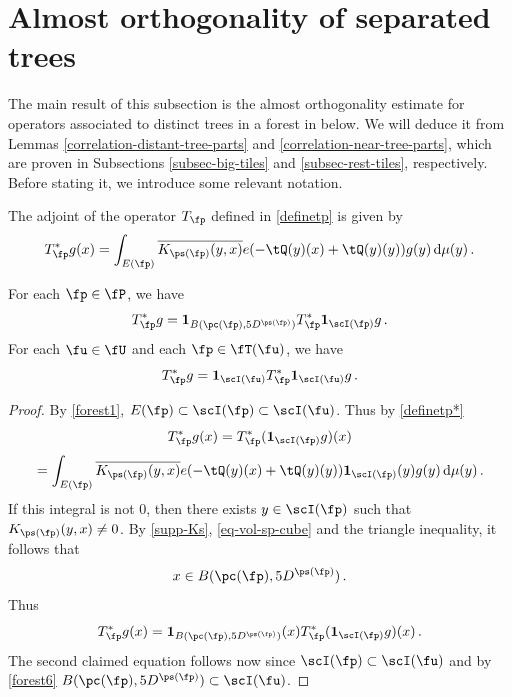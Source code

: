 \section{Almost orthogonality of separated trees}

The main result of this subsection is the almost orthogonality estimate for operators associated to distinct trees in a forest in  below. We will deduce it from Lemmas \ref{correlation-distant-tree-parts} and \ref{correlation-near-tree-parts}, which are proven in Subsections \ref{subsec-big-tiles} and \ref{subsec-rest-tiles}, respectively. Before stating it, we introduce some relevant notation.

The adjoint of the operator $T_{\fp}$ defined in \eqref{definetp} is given by
\begin{equation}
    \label{definetp*}
    T_{\fp}^* g(x) = \int_{E(\fp)} \overline{K_{\ps(\fp)}(y,x)} e(-\tQ(y)(x)+ \tQ(y)(y)) g(y) \, \mathrm{d}\mu(y)\,.
\end{equation}

\begin{lemma}
    \label{adjoint-tile-support}
    For each $\fp \in \fP$, we have
    $$
        T_{\fp}^* g = \mathbf{1}_{B(\pc(\fp), 5D^{\ps(\fp)})} T_{\fp}^* \mathbf{1}_{\scI(\fp)} g\,.
    $$
    For each $\fu \in \fU$ and each $\fp \in \fT(\fu)$, we have
    $$
        T_{\fp}^* g = \mathbf{1}_{\scI(\fu)} T_{\fp}^* \mathbf{1}_{\scI(\fu)} g\,.
    $$
\end{lemma}

\begin{proof}
    By \eqref{forest1}, $E(\fp) \subset \scI(\fp) \subset \scI(\fu)$. Thus by \eqref{definetp*}
    $$
         T_{\fp}^* g(x) = T_{\fp}^* (\mathbf{1}_{\scI(\fp)} g)(x)
    $$
    $$
        = \int_{E(\fp)} \overline{K_{\ps(\fp)}(y,x)} e(-\tQ(y)(x) + \tQ(y)(y)) \mathbf{1}_{\scI(\fp)}(y) g(y) \, \mathrm{d}\mu(y)\,.
    $$
    If this integral is not $0$, then there exists $y \in \scI(\fp)$ such that $K_{\ps(\fp)}(y,x) \ne 0$. By \eqref{supp-Ks}, \eqref{eq-vol-sp-cube} and the triangle inequality, it follows that
    \begin{equation*}
        x \in B(\pc(\fp), 5 D^{\ps(\fp)})\, .
    \end{equation*}
    Thus
    $$
        T_{\fp}^* g(x) = \mathbf{1}_{B(\pc(\fp), 5D^{\ps(\fp)})}(x) T_{\fp}^* (\mathbf{1}_{\scI(\fp)} g)(x)\,.
    $$
    The second claimed equation follows now since $\scI(\fp) \subset \scI(\fu)$ and by \eqref{forest6} $B(\pc(\fp), 5D^{\ps(\fp)}) \subset \scI(\fu)$.
\end{proof}

